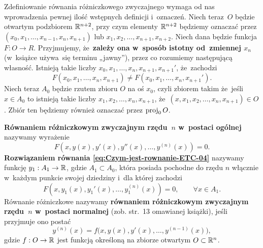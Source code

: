 \documentclass[a4paper,11pt]{article}
\numberwithin{equation}{section}
\begin{document}
Zdefiniowanie równania różniczkowego zwyczajnego wymaga od nas wprowadzenia
pewnej ilość wstępnych definicji i~oznaczeń. Niech teraz~$O$ będzie
otwartym podzbiorem $\mathbb{R}^{ n + 2 }$, przy czym
elementy $\mathbb{R}^{ n + 2 }$ będziemy oznaczać przez
$( x_{ 0 }, x_{ 1 }, \ldots, x_{ n - 1 }, x_{ n }, x_{ n + 1 } )$
lub $x_{ 1 }, x_{ 2 }, \ldots, x_{ n + 1 }, x_{ n + 2 }$. Niech dana będzie funkcja
$F : O \to R$. Przyjmujemy, że~\textbf{zależy ona w~sposób istotny
  od~zmiennej $x_{ n }$} (w~książce używa~się terminu „jawny”), przez co
rozumiemy następującą własność. Istnieją takie liczby
$x_{ 0 }, x_{ 1 }, \ldots, x_{ n }, x_{ n + 1 }, x_{ n + 1 }'$, że~zachodzi
\begin{equation}
  \label{eq:Czym-jest-rownanie-ETC-03}
  F( x_{ 0 }, x_{ 1 }, \ldots, x_{ n }, x_{ n + 1 } ) \neq
  F( x_{ 0 }, x_{ 1 }, \ldots, x_{ n }, x_{ n + 1 }' ).
\end{equation}
Niech teraz $A_{ 0 }$ będzie rzutem zbioru $O$ na oś $x_{ 0 }$, czyli zbiorem
takim że~jeśli $x \in A_{ 0 }$ to istnieją takie liczby
$x_{ 1 }, x_{ 2 }, \ldots, x_{ n }, x_{ n + 1 }$,
że~$( x, x_{ 1 }, x_{ 2 }, \ldots, x_{ n }, x_{ n + 1 } ) \in O$. Zbiór ten
będziemy również oznaczać przez $\operatorname{proj}_{ 0 } O$.

\textbf{Równaniem różniczkowym zwyczajnym rzędu~$n$ w~postaci ogólnej}
nazywamy wyrażenie
\begin{equation}
  \label{eq:Czym-jest-rownanie-ETC-04}
  F\left( x, y( x ), y'( x ), y''( x ), \ldots, y^{ ( n ) }( x ) \right) = 0.
\end{equation}
\textbf{Rozwiązaniem równania \eqref{eq:Czym-jest-rownanie-ETC-04}}
nazywamy funkcję $y_{ 1 } : A_{ 1 } \to \mathbb{R}$, gdzie $A_{ 1 } \subset A_{ 0 }$, która
posiada pochodne do rzędu $n$ włącznie w~każdym punkcie swojej dziedziny
i~dla której zachodzi
\begin{equation}
  \label{eq:Czym-jest-rownanie-ETC-05}
  F\left( x, y_{ 1 }( x ), y_{ 1 }'( x ), \ldots, y_{ 1 }^{ ( n ) }( x ) \right) =
  0, \qquad
  \forall x \in A_{ 1 }.
\end{equation}
Równanie różniczkowe nazywamy \textbf{równaniem różniczkowym
  zwyczajnym rzędu~$n$ w~postaci normalnej} (zob. str.~13 omawianej
książki), jeśli przyjmuje ono postać
\begin{equation}
  \label{eq:Czym-jest-rownanie-ETC-06}
  y^{ ( n ) }( x ) = f\big( x, y( x ), y'( x ), \ldots, y^{ ( n - 1 ) }( x ) \big),
\end{equation}
gdzie $f : O \to \mathbb{R}$ jest funkcją określoną na zbiorze otwartym
$O \subset \mathbb{R}^{ n }$.
\end{document}

